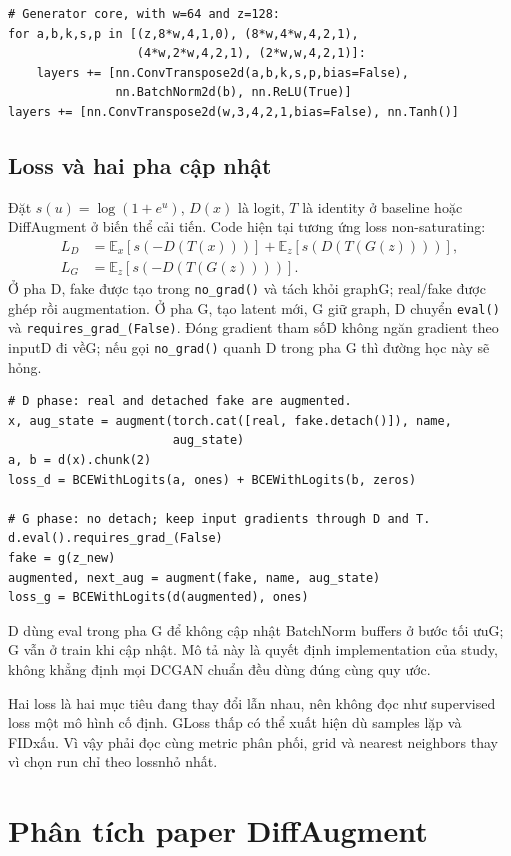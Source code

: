 \documentclass[11pt,a4paper]{article}
\begin{document}
\begin{lstlisting}
# Generator core, with w=64 and z=128:
for a,b,k,s,p in [(z,8*w,4,1,0), (8*w,4*w,4,2,1),
                  (4*w,2*w,4,2,1), (2*w,w,4,2,1)]:
    layers += [nn.ConvTranspose2d(a,b,k,s,p,bias=False),
               nn.BatchNorm2d(b), nn.ReLU(True)]
layers += [nn.ConvTranspose2d(w,3,4,2,1,bias=False), nn.Tanh()]
\end{lstlisting}
\clearpage

\subsection{Loss và hai pha cập nhật}
Đặt $s(u)=\log(1+e^u)$, $D(x)$ là logit, $T$ là identity ở baseline hoặc DiffAugment ở biến thể cải tiến. Code hiện tại tương ứng loss non-saturating:
\begin{align}
L_D&=\mathbb E_x[s(-D(T(x)))]+\mathbb E_z[s(D(T(G(z))))],\\
L_G&=\mathbb E_z[s(-D(T(G(z))))].
\end{align}
Ở pha D, fake được tạo trong \texttt{no\_grad()} và tách khỏi graphG; real/fake được ghép rồi augmentation. Ở pha G, tạo latent mới, G giữ graph, D chuyển \texttt{eval()} và \texttt{requires\_grad\_(False)}. Đóng gradient tham sốD không ngăn gradient theo inputD đi vềG; nếu gọi \texttt{no\_grad()} quanh D trong pha G thì đường học này sẽ hỏng.
\begin{lstlisting}
# D phase: real and detached fake are augmented.
x, aug_state = augment(torch.cat([real, fake.detach()]), name,
                       aug_state)
a, b = d(x).chunk(2)
loss_d = BCEWithLogits(a, ones) + BCEWithLogits(b, zeros)

# G phase: no detach; keep input gradients through D and T.
d.eval().requires_grad_(False)
fake = g(z_new)
augmented, next_aug = augment(fake, name, aug_state)
loss_g = BCEWithLogits(d(augmented), ones)
\end{lstlisting}
D dùng eval trong pha G để không cập nhật BatchNorm buffers ở bước tối ưuG; G vẫn ở train khi cập nhật. Mô tả này là quyết định implementation của study, không khẳng định mọi DCGAN chuẩn đều dùng đúng cùng quy ước.

Hai loss là hai mục tiêu đang thay đổi lẫn nhau, nên không đọc như supervised loss một mô hình cố định. GLoss thấp có thể xuất hiện dù samples lặp và FIDxấu. Vì vậy phải đọc cùng metric phân phối, grid và nearest neighbors thay vì chọn run chỉ theo lossnhỏ nhất.
\clearpage

\section{Phân tích paper DiffAugment}\label{sec:paper}
\end{document}
